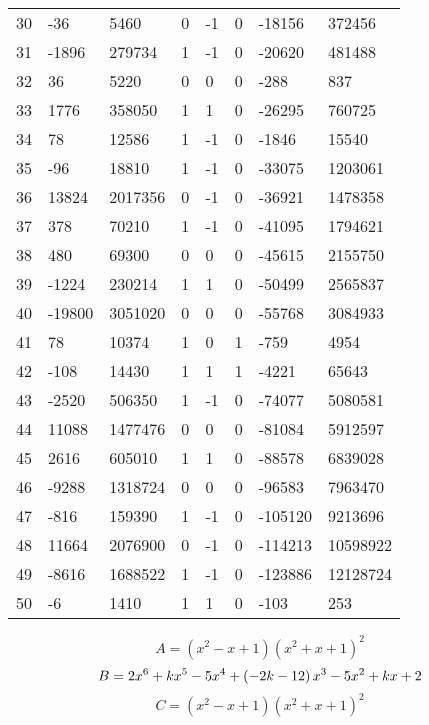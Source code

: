 \documentclass{amsart}
\begin{document}
\begin{longtable}{|l|l|l|lllll|}
30&-36&5460&0&-1&0&-18156&372456\\
31&-1896&279734&1&-1&0&-20620&481488\\
32&36&5220&0&0&0&-288&837\\
33&1776&358050&1&1&0&-26295&760725\\
34&78&12586&1&-1&0&-1846&15540\\
35&-96&18810&1&-1&0&-33075&1203061\\
36&13824&2017356&0&-1&0&-36921&1478358\\
37&378&70210&1&-1&0&-41095&1794621\\
38&480&69300&0&0&0&-45615&2155750\\
39&-1224&230214&1&1&0&-50499&2565837\\
40&-19800&3051020&0&0&0&-55768&3084933\\
41&78&10374&1&0&1&-759&4954\\
42&-108&14430&1&1&1&-4221&65643\\
43&-2520&506350&1&-1&0&-74077&5080581\\
44&11088&1477476&0&0&0&-81084&5912597\\
45&2616&605010&1&1&0&-88578&6839028\\
46&-9288&1318724&0&0&0&-96583&7963470\\
47&-816&159390&1&-1&0&-105120&9213696\\
48&11664&2076900&0&-1&0&-114213&10598922\\
49&-8616&1688522&1&-1&0&-123886&12128724\\
50&-6&1410&1&1&0&-103&253\\
\hline
\end{longtable}
$$A=(x^2
 - x
 + 1)(x^2
 + x
 + 1)^{2}$$
$$B=2\*x^6
 + k\*x^5
 - 5\*x^4
 + \left(-2\*k
 - 12\right) \*x^3
 - 5\*x^2
 + k\*x
 + 2$$
$$C=(x^2
 - x
 + 1)(x^2
 + x
 + 1)^{2}$$
\end{document}
